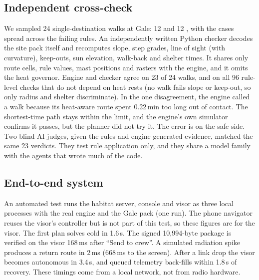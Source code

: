 \subsection{Independent cross-check}
\label{sec:eval-crosscheck}
We sampled 24 single-destination walks at Gale: 12 \go and 12 \nogo, with the \nogo cases spread across the failing rules. An independently written Python checker decodes the site pack itself and recomputes slope, step grades, line of sight (with curvature), keep-outs, sun elevation, walk-back and shelter times. It shares only route cells, rule values, mast positions and rasters with the engine, and it omits the heat governor. Engine and checker agree on 23 of 24 walks, and on all 96 rule-level checks that do not depend on heat rests (no walk fails slope or keep-out, so only radius and shelter discriminate). In the one disagreement, the engine called a walk \nogo because its heat-aware route spent 0.22\,min too long out of contact. The shortest-time path stays within the limit, and the engine's own simulator confirms it passes, but the planner did not try it. The error is on the safe side. Two blind AI judges, given the rules and engine-generated evidence, matched the same 23 verdicts. They test rule application only, and they share a model family with the agents that wrote much of the code.

\subsection{End-to-end system}
\label{sec:eval-system}
An automated test runs the habitat server, console and visor as three local processes with the real engine and the Gale pack (one run). The phone navigator reuses the visor's controller but is not part of this test, so these figures are for the visor. The first plan solves cold in 1.6\,s. The signed 10,994-byte package is verified on the visor 168\,ms after ``Send to crew''. A simulated radiation spike produces a return route in 2\,ms (668\,ms to the screen). After a link drop the visor becomes autonomous in 3.4\,s, and queued telemetry back-fills within 1.8\,s of recovery. These timings come from a local network, not from radio hardware.
